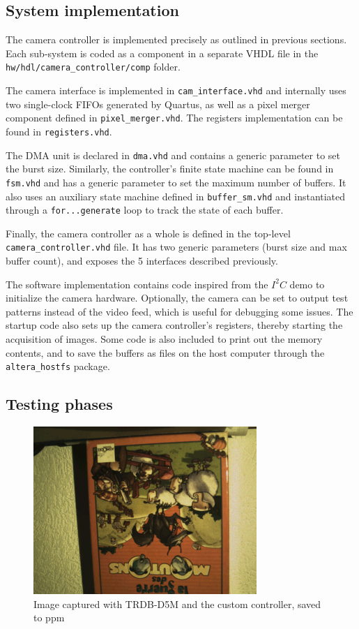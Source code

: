 \documentclass[12pt,a4paper]{article}
\begin{document}
\subsection{System implementation}

The camera controller is implemented precisely as outlined in previous sections. Each sub-system is coded as a component in a separate VHDL file in the \texttt{hw/hdl/camera\_controller/comp} folder.

The camera interface is implemented in \texttt{cam\_interface.vhd} and internally uses two single-clock FIFOs generated by Quartus, as well as a pixel merger component defined in \texttt{pixel\_merger.vhd}. The registers implementation can be found in \texttt{registers.vhd}.

The DMA unit is declared in \texttt{dma.vhd} and contains a generic parameter to set the burst size. Similarly, the controller's finite state machine can be found in \texttt{fsm.vhd} and has a generic parameter to set the maximum number of buffers. It also uses an auxiliary state machine defined in \texttt{buffer\_sm.vhd} and instantiated through a \texttt{for...generate} loop to track the state of each buffer.

Finally, the camera controller as a whole is defined in the top-level \texttt{camera\_controller.vhd} file. It has two generic parameters (burst size and max buffer count), and exposes the 5 interfaces described previously.

\bigskip
The software implementation contains code inspired from the $I^2C$ demo to initialize the camera hardware. Optionally, the camera can be set to output test patterns instead of the video feed, which is useful for debugging some issues. The startup code also sets up the camera controller's registers, thereby starting the acquisition of images. Some code is also included to print out the memory contents, and to save the buffers as files on the host computer through the \texttt{altera\_hostfs} package.

\subsection{Testing phases}

\begin{figure}[h]
	\centering
	\includegraphics[width=.6\textwidth]{figures/capture}
	\caption{Image captured with TRDB-D5M and the custom controller, saved to ppm}
	\label{fig:ppm}
\end{figure}
\end{document}
